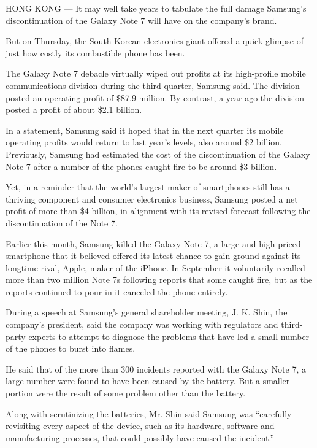 HONG KONG --- It may well take years to tabulate the full damage
Samsung's discontinuation of the Galaxy Note 7 will have on the
company's brand.

But on Thursday, the South Korean electronics giant offered a quick
glimpse of just how costly its combustible phone has been.

The Galaxy Note 7 debacle virtually wiped out profits at its
high-profile mobile communications division during the third quarter,
Samsung said. The division posted an operating profit of \$87.9 million.
By contrast, a year ago the division posted a profit of about \$2.1
billion.

In a statement, Samsung said it hoped that in the next quarter its
mobile operating profits would return to last year's levels, also around
\$2 billion. Previously, Samsung had estimated the cost of the
discontinuation of the Galaxy Note 7 after a number of the phones caught
fire to be around \$3 billion.

Yet, in a reminder that the world's largest maker of smartphones still
has a thriving component and consumer electronics business, Samsung
posted a net profit of more than \$4 billion, in alignment with its
revised forecast following the discontinuation of the Note 7.

Earlier this month, Samsung killed the Galaxy Note 7, a large and
high-priced smartphone that it believed offered its latest chance to
gain ground against its longtime rival, Apple, maker of the iPhone. In
September
\href{http://www.nytimes.com/2016/09/16/business/samsung-galaxy-note-recall.html}{it
voluntarily recalled} more than two million Note 7s following reports
that some caught fire, but as the reports
\href{http://www.nytimes.com/2016/10/12/business/international/samsung-galaxy-note7-terminated.html}{continued
to pour in} it canceled the phone entirely.

During a speech at Samsung's general shareholder meeting, J. K. Shin,
the company's president, said the company was working with regulators
and third-party experts to attempt to diagnose the problems that have
led a small number of the phones to burst into flames.

He said that of the more than 300 incidents reported with the Galaxy
Note 7, a large number were found to have been caused by the battery.
But a smaller portion were the result of some problem other than the
battery.

Along with scrutinizing the batteries, Mr. Shin said Samsung was
``carefully revisiting every aspect of the device, such as its hardware,
software and manufacturing processes, that could possibly have caused
the incident.''

